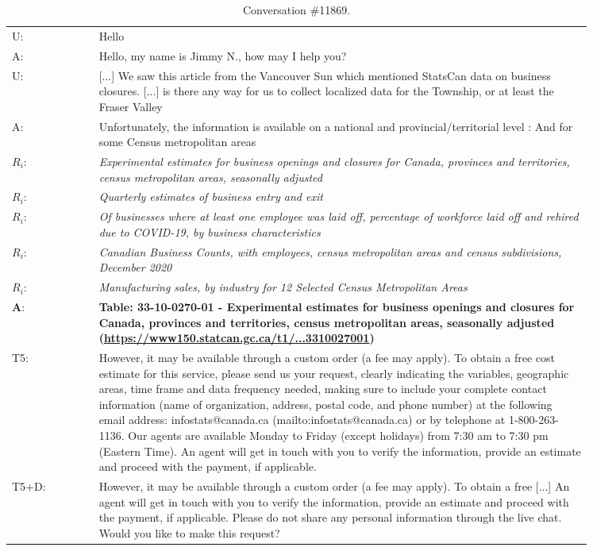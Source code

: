 \documentclass[11pt]{article}
\begin{document}
\begin{table*}[]
\small
\centering
\begin{tabular}{l p{0.85\linewidth}}
\toprule
U: & Hello 
\\
A: & Hello, my name is Jimmy N., how may I help you? 
\\
U: & [...] We saw this article from the Vancouver Sun which mentioned StatsCan data on business closures. [...] is there any way for us to collect localized data for the Township, or at least the Fraser Valley 
\\
A: & Unfortunately, the information is available on a national and provincial/territorial level : And for some Census metropolitan areas
\\
$R_i$: & \textit{Experimental estimates for business openings and closures for Canada, provinces and territories, census metropolitan areas, seasonally adjusted}
\\
$R_i$: & \textit{Quarterly estimates of business entry and exit}
\\
$R_i$: & \textit{Of businesses where at least one employee was laid off, percentage of workforce laid off and rehired due to COVID-19, by business characteristics}
\\
$R_i$: & \textit{Canadian Business Counts, with employees, census metropolitan areas and census subdivisions, December 2020}
\\
$R_i$: & \textit{Manufacturing sales, by industry for 12 Selected Census Metropolitan Areas}
\\
\midrule
\textbf{A}: & \textbf{Table: 33-10-0270-01 - Experimental estimates for business openings and closures for Canada, provinces and territories, census metropolitan areas, seasonally adjusted (\href{https://www150.statcan.gc.ca/t1/tbl1/en/tv.action?pid=3310027001}{https://www150.statcan.gc.ca/t1/...3310027001})}
\\
T5: & However, it may be available through a custom order (a fee may apply). To obtain a free cost estimate for this service, please send us your request, clearly indicating the variables, geographic areas, time frame and data frequency needed, making sure to include your complete contact information (name of organization, address, postal code, and phone number) at the following email address: infostats@canada.ca (mailto:infostats@canada.ca) or by telephone at 1-800-263-1136. Our agents are available Monday to Friday (except holidays) from 7:30 am to 7:30 pm (Eastern Time). An agent will get in touch with you to verify the information, provide an estimate and proceed with the payment, if applicable.
\\
T5+D: & However, it may be available through a custom order (a fee may apply). To obtain a free [...] An agent will get in touch with you to verify the information, provide an estimate and proceed with the payment, if applicable. Please do not share any personal information through the live chat. Would you like to make this request?
\\
\bottomrule
\end{tabular}
\caption{Conversation \#11869.}
\label{tab:sample_conversation_11869}
\end{table*}
\end{document}
